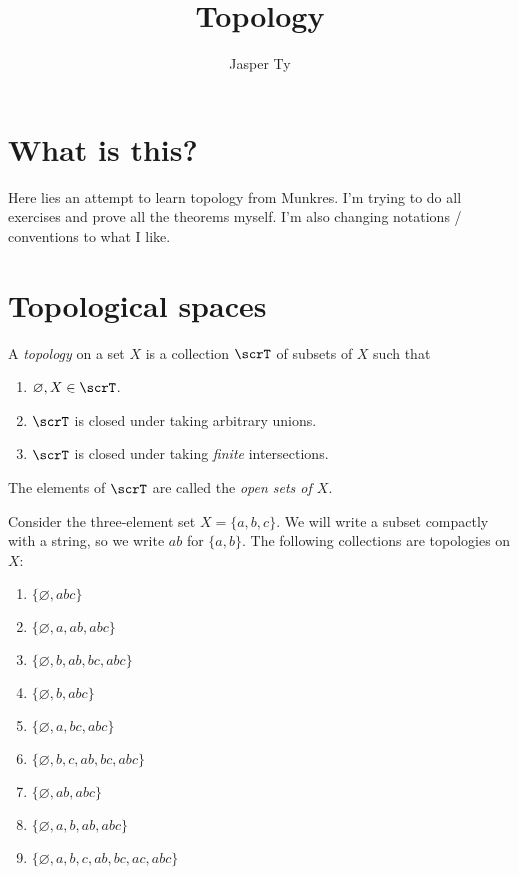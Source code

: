 \documentclass{article}
\title{Topology}
\author{Jasper Ty}
\date{}
\begin{document}
\maketitle

\section*{What is this?}

Here lies an attempt to learn topology from Munkres.
I'm trying to do all exercises and prove all the theorems myself.
I'm also changing notations / conventions to what I like.

\tableofcontents

\setcounter{section}{11}
\section{Topological spaces}

\begin{definition}
    A \textit{topology} on a set $X$ is a collection $\scrT$ of subsets of $X$ such that
    \begin{enumerate}[label=(T\arabic*)]
        \item $\varnothing, X \in \scrT$. 
            \label{item:topbtmelems}
        \item $\scrT$ is closed under taking arbitrary unions.
            \label{item:arbunion}
        \item $\scrT$ is closed under taking \textit{finite} intersections.
            \label{item:finintersect}
    \end{enumerate}
    The elements of $\scrT$ are called the \textit{open sets of $X$}.
\end{definition}

\begin{example}
    Consider the three-element set $X=\{a,b,c\}$.
    We will write a subset compactly with a string, so we write $ab$ for $\{a,b\}$.
    The following collections are topologies on $X$:
    \begin{enumerate}[label=(\alph*)]
        \item $\{\varnothing,abc\}$
        \item $\{\varnothing,a,ab,abc\}$
        \item $\{\varnothing,b,ab,bc,abc\}$
        \item $\{\varnothing,b,abc\}$
        \item $\{\varnothing,a,bc,abc\}$
        \item $\{\varnothing,b,c,ab,bc,abc\}$
        \item $\{\varnothing,ab,abc\}$
        \item $\{\varnothing,a,b,ab,abc\}$
        \item $\{\varnothing,a,b,c,ab,bc,ac,abc\}$
    \end{enumerate}
\end{example}
\end{document}

